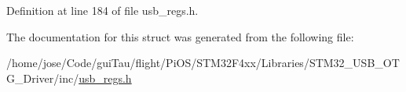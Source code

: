 Definition at line 184 of file usb\-\_\-regs.\-h.



The documentation for this struct was generated from the following file\-:\begin{DoxyCompactItemize}
\item 
/home/jose/\-Code/gui\-Tau/flight/\-Pi\-O\-S/\-S\-T\-M32\-F4xx/\-Libraries/\-S\-T\-M32\-\_\-\-U\-S\-B\-\_\-\-O\-T\-G\-\_\-\-Driver/inc/\hyperlink{_s_t_m32_f4xx_2_libraries_2_s_t_m32___u_s_b___o_t_g___driver_2inc_2usb__regs_8h}{usb\-\_\-regs.\-h}\end{DoxyCompactItemize}
